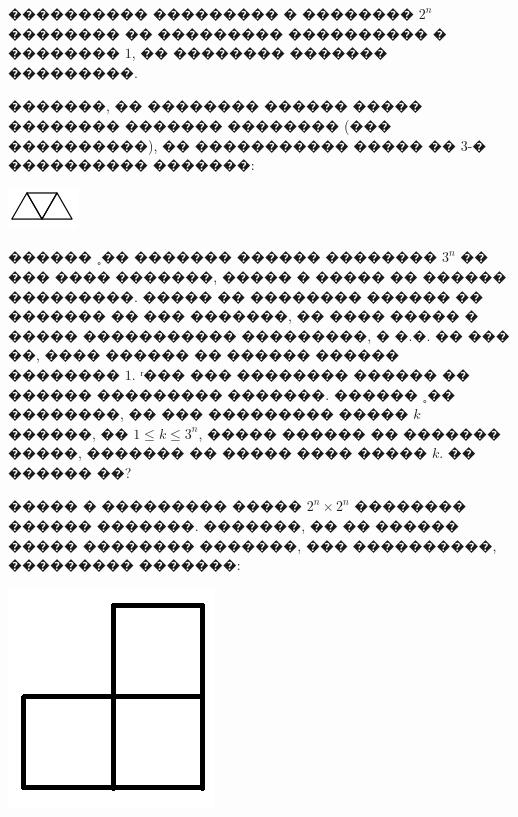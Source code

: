 \documentclass[a4paper,12pt]{article}
\begin{document}
\begin{enumerate}
\begin{minipage}{.35\textwidth}
\end{minipage}
\begin{minipage}{.55\textwidth}
\item ���������� ��������� � �������� $2^{n}$ �������� �� ��������� ���������� � �������� $1$, �� �������� ������� ���������.
\end{minipage}

\begin{minipage}{.55\textwidth}
       �������, �� �������� ������ ����� �������� ������� �������� (��� ����������), �� ����������� ����� �� $3$-� ���������� �������:
\end{minipage}
\begin{minipage}{.35\textwidth}
\begin{center}
\includegraphics[scale=0.6]{tr2.png}
\end{center}
\end{minipage}



\item ������ ˳�� ������� ������ �������� $3^{n}$ �� ��� ���� �������, ����� � ����� �� ������ ���������. ����� �� �������� ������ �� ������� �� ��� �������, �� ���� ����� � ����� ����������� ���������, � �.�. �� ��� ��, ���� ������ �� ������ ������ �������� $1$. ʳ��� ��� �������� ������ �� ������ ��������� �������. ������ ˳�� ��������, �� ��� ��������� ����� $k$ ������, �� $1\leq k \leq 3^{n}$, ����� ������ �� ������� �����, ������� �� ����� ���� ����� $k$. �� ������ ��?



\begin{minipage}{.55\textwidth}
       \item ����� � ��������� ����� $2^{n}\times 2^{n}$ �������� ������ �������. �������, �� �� ������ ����� �������� �������, ��� ����������, ��������� �������:
\end{minipage}
\begin{minipage}{.35\textwidth}
\begin{center}
\includegraphics[scale=0.3]{triomino.png}
\end{center}
\end{minipage}



\end{enumerate}
\end{document}

